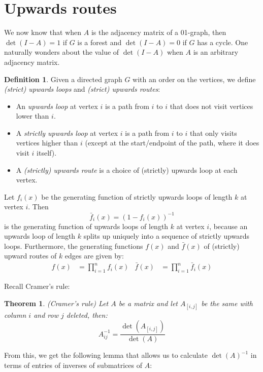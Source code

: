 \documentclass[a4paper, 11pt]{article}
\newtheorem{theorem}{Theorem}[section]
\theoremstyle{definition}
\newtheorem{definition}{Definition}[section]
\begin{document}
\section{Upwards routes}

We now know that when $A$ is the adjacency matrix of a 01-graph, then $\det(I - A) = 1$ if $G$ is a forest and $\det(I - A) = 0$ if $G$ has a cycle. One naturally wonders about the value of $\det(I - A)$ when $A$ is an arbitrary adjacency matrix.

\begin{definition}
  Given a directed graph $G$ with an order on the vertices, we define \emph{(strict) upwards loops} and \emph{(strict) upwards routes}:
  \begin{itemize}
    \item An \emph{upwards loop} at vertex $i$ is a path from $i$ to $i$ that does not visit vertices lower than $i$.
    \item A \emph{strictly upwards loop} at vertex $i$ is a path from $i$ to $i$ that only visits vertices higher than $i$ (except at the start/endpoint of the path, where it does visit $i$ itself).
    \item A \emph{(strictly) upwards route} is a choice of (strictly) upwards loop at each vertex.
  \end{itemize}
  Let $f_i(x)$ be the generating function of strictly upwards loops of length $k$ at vertex $i$. Then \[ \bar{f}_i(x) = (1 - f_i(x))^{-1} \] is the generating function of upwards loops of length $k$ at vertex $i$, because an upwards loop of length $k$ splits up uniquely into a sequence of strictly upwards loops. Furthermore, the generating functions $f(x)$ and $\bar{f}(x)$ of (strictly) upward routes of $k$ edges are given by:
  \begin{align*}
    f(x) &= \prod_{i=1}^n f_i(x) &
    \bar{f}(x) &= \prod_{i=1}^n \bar{f}_i(x)
  \end{align*}
\end{definition}

Recall Cramer's rule:
\begin{theorem} (Cramer's rule)
  Let $A$ be a matrix and let $A_{[i,j]}$ be the same with column $i$ and row $j$ deleted, then:
  \[ A^{-1}_{ij} = \frac{\det(A_{[i,j]})}{\det(A)} \]
\end{theorem}

From this, we get the following lemma that allows us to calculate $\det(A)^{-1}$ in terms of entries of inverses of submatrices of $A$:
\end{document}
